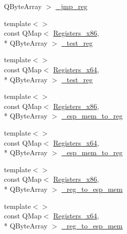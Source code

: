 \begin{DoxyCompactItemize}
Q\-Byte\-Array $>$ \hyperlink{class_code_defines_a73ff4f7f2b74b15b871d0771107c9bca}{\-\_\-jmp\-\_\-reg}
\item 
{\footnotesize template$<$$>$ }\\const Q\-Map$<$ \hyperlink{codedefines_8h_a0f84efe4ca4d99203713a78bd6e8c82e}{Registers\-\_\-x86}, \\*
Q\-Byte\-Array $>$ \hyperlink{class_code_defines_a8565fc28ce3f31e91f7993a7e6217473}{\-\_\-test\-\_\-reg}
\item 
{\footnotesize template$<$$>$ }\\const Q\-Map$<$ \hyperlink{codedefines_8h_a5e15b5c4d766f6faf29b5bcec37bde5c}{Registers\-\_\-x64}, \\*
Q\-Byte\-Array $>$ \hyperlink{class_code_defines_ade6305380a1f3084a545e3abd97321d8}{\-\_\-test\-\_\-reg}
\item 
{\footnotesize template$<$$>$ }\\const Q\-Map$<$ \hyperlink{codedefines_8h_a0f84efe4ca4d99203713a78bd6e8c82e}{Registers\-\_\-x86}, \\*
Q\-Byte\-Array $>$ \hyperlink{class_code_defines_a5ae0b345ca9758b0460b67d5f8808b29}{\-\_\-esp\-\_\-mem\-\_\-to\-\_\-reg}
\item 
{\footnotesize template$<$$>$ }\\const Q\-Map$<$ \hyperlink{codedefines_8h_a5e15b5c4d766f6faf29b5bcec37bde5c}{Registers\-\_\-x64}, \\*
Q\-Byte\-Array $>$ \hyperlink{class_code_defines_af69b898d7bf37dccb24031aa77629feb}{\-\_\-esp\-\_\-mem\-\_\-to\-\_\-reg}
\item 
{\footnotesize template$<$$>$ }\\const Q\-Map$<$ \hyperlink{codedefines_8h_a0f84efe4ca4d99203713a78bd6e8c82e}{Registers\-\_\-x86}, \\*
Q\-Byte\-Array $>$ \hyperlink{class_code_defines_ac979fb5566e1396d3d2816048e1c0afa}{\-\_\-reg\-\_\-to\-\_\-esp\-\_\-mem}
\item 
{\footnotesize template$<$$>$ }\\const Q\-Map$<$ \hyperlink{codedefines_8h_a5e15b5c4d766f6faf29b5bcec37bde5c}{Registers\-\_\-x64}, \\*
Q\-Byte\-Array $>$ \hyperlink{class_code_defines_a1af26d87a7d2758b6504882227e72eb1}{\-\_\-reg\-\_\-to\-\_\-esp\-\_\-mem}
\end{DoxyCompactItemize}
